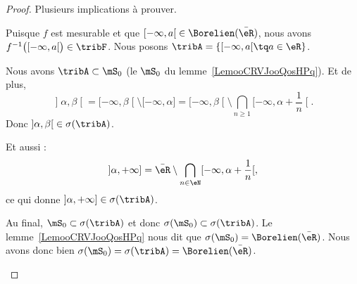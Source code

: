 \begin{proof}
	Plusieurs implications à prouver.
	\begin{subproof}
		\spitem[\ref{ITEMooHAMHooYLqUhVi}\( \Rightarrow\)\ref{ITEMooHAMHooYLqUhVii}]
		Puisque \( f\) est mesurable et que \( \mathopen[ -\infty , a \mathclose[\in\Borelien(\bar\eR)\), nous avons \( f^{-1}\big( \mathopen[ -\infty , a \mathclose[ \big)\in\tribF\).
		\spitem[\ref{ITEMooHAMHooYLqUhVii}\( \Rightarrow\)\ref{ITEMooHAMHooYLqUhVi}]
		Nous posons \( \tribA=\{ \mathopen[ -\infty , a \mathclose[\tq a\in \eR \}\).

				Nous avons \( \tribA\subset\mS_0\) (le \( \mS_0\) du lemme~\ref{LemooCRVJooQosHPq}). Et de plus,
				\begin{equation}
					\mathopen] \alpha , \beta \mathclose[=\mathopen[ -\infty , \beta \mathclose[\setminus\mathopen[ -\infty , \alpha \mathclose]=\mathopen[ -\infty , \beta \mathclose[\setminus\bigcap_{n\geq 1}\mathopen[ -\infty , \alpha+\frac{1}{ n } \mathclose[.
				\end{equation}
				Donc \( \mathopen] \alpha , \beta \mathclose[\in\sigma(\tribA)\).

				Et aussi :
				\begin{equation}
					\mathopen] \alpha , +\infty \mathclose]=\bar\eR\setminus\bigcap_{n\in \eN}\mathopen[ -\infty , \alpha+\frac{1}{ n } \mathclose[,
				\end{equation}
				ce qui donne \( \mathopen] \alpha , +\infty \mathclose]\in \sigma(\tribA)\).

		Au final, \( \mS_0\subset\sigma(\tribA)\) et donc \( \sigma(\mS_0)\subset\sigma(\tribA)\). Le lemme~\ref{LemooCRVJooQosHPq} nous dit que \( \sigma(\mS_0)=\Borelien(\bar \eR)\). Nous avons donc bien \( \sigma(\mS_0)=\sigma(\tribA)=\Borelien(\bar\eR)\).


\end{subproof}
\end{proof}
